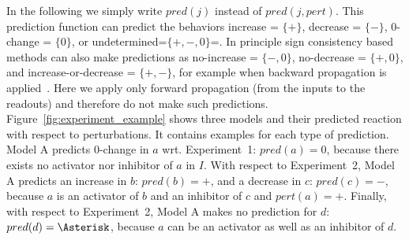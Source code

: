 
In the following we simply write $pred(j)$ instead of $pred(j,pert)$.
This prediction function can predict the behaviors
 increase = $\{\plus\}$,
 decrease = $\{\minus\}$,
 0-change = $\{0\}$, or
 undetermined=$\{\plus,\minus,0 \}$=\am.
In principle sign consistency based methods can also make predictions as
 no-increase          = $\{\minus,0 \}$,
 no-decrease          = $\{\plus,0 \}$, and
 increase-or-decrease = $\{\plus, \minus\}$,
for example when backward propagation is applied~\cite{sthiele15}.
Here we apply only forward propagation (from the inputs to the readouts) and
therefore do not make such predictions.
Figure~\ref{fig:experiment_example} shows three models and their predicted
reaction with respect to perturbations.
It contains examples for each type of prediction.
Model A predicts 0-change in $a$ wrt. Experiment~1: $pred(a)= 0$, because there
exists no activator nor inhibitor of $a$ in $I$.
With respect to Experiment~2,
Model A predicts an increase in $b$: $pred(b)=\plus$, and a decrease in $c$: $pred(c)=\minus$,
because $a$ is an activator of $b$ and an inhibitor of $c$ and $pert(a)=\plus$.
Finally, with respect to Experiment~2, Model A makes no prediction for $d$: $pred(d)=\Asterisk$,
because $a$ can be an activator as well as an inhibitor of $d$.


